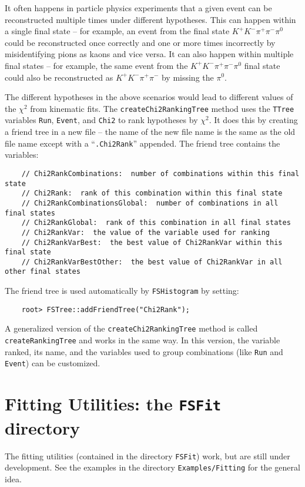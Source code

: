 \documentclass[11pt]{article}
\begin{document}
It often happens in particle physics experiments that a given event can be reconstructed multiple times under different hypotheses.  This can happen within a single final state -- for example, an event from the final state $K^+K^-\pi^+\pi^-\pi^0$ could be reconstructed once correctly and one or more times incorrectly by misidentifying pions as kaons and vice versa.  It can also happen within multiple final states -- 
for example, the same event from the $K^+K^-\pi^+\pi^-\pi^0$ final state could also be reconstructed as $K^+K^-\pi^+\pi^-$ by missing the $\pi^0$.  

The different hypotheses in the above scenarios would lead to different values of the $\chi^2$ from kinematic fits.  The {\tt createChi2RankingTree} method uses the {\tt TTree} variables {\tt Run}, {\tt Event}, and {\tt Chi2} to rank hypotheses by $\chi^2$.  It does this by creating a friend tree in a new file -- the name of the new file name is the same as the old file name except with a ``{\tt .Chi2Rank}'' appended.  The friend tree contains the variables:
\begin{verbatim}
    // Chi2RankCombinations:  number of combinations within this final state
    // Chi2Rank:  rank of this combination within this final state
    // Chi2RankCombinationsGlobal:  number of combinations in all final states
    // Chi2RankGlobal:  rank of this combination in all final states
    // Chi2RankVar:  the value of the variable used for ranking
    // Chi2RankVarBest:  the best value of Chi2RankVar within this final state
    // Chi2RankVarBestOther:  the best value of Chi2RankVar in all other final states
\end{verbatim}
The friend tree is used automatically by {\tt FSHistogram} by setting:
\begin{verbatim}
    root> FSTree::addFriendTree("Chi2Rank");
\end{verbatim}
A generalized version of the {\tt createChi2RankingTree} method is called {\tt createRankingTree} and works in the same way.  In this version, the variable ranked, its name, and the variables used to group combinations (like {\tt Run} and {\tt Event}) can be customized.


\section{Fitting Utilities:  the {\tt FSFit} directory}

The fitting utilities (contained in the directory {\tt FSFit}) work, but are still under development.  See the examples in the directory {\tt Examples/Fitting} for the general idea.
\end{document}
